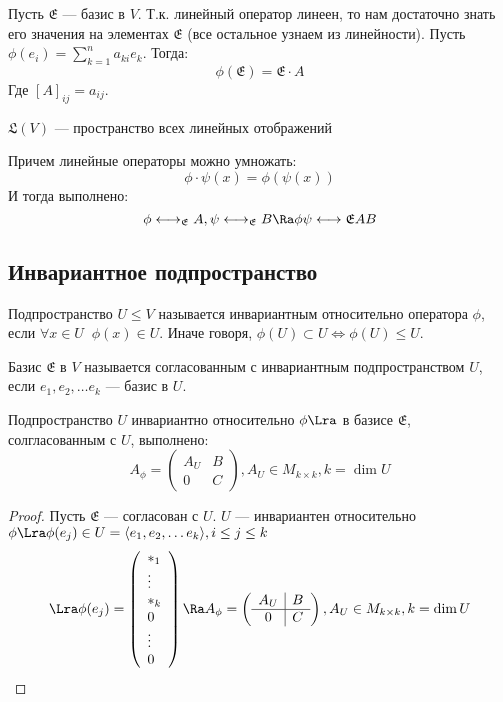 Пусть  \(\mathfrak{E}\) --- базис в \(V\). Т.к. линейный оператор линеен, то нам достаточно знать его значения на элементах \(\mathfrak{E}\) (все остальное узнаем из линейности).
Пусть \(\phi(e_i) = \sum_{k = 1}^n a_{ki}e_k\). Тогда:
\[\phi(\mathfrak{E}) = \mathfrak{E}\cdot A\]
Где \([A]_{ij} = a_{ij}\).

\begin{definition}
    \(\mathfrak{L}(V)\) --- пространство всех линейных отображений
\end{definition}

Причем линейные операторы можно умножать:
\[\phi\cdot\psi(x) = \phi(\psi(x))\]
И тогда выполнено:
\[\phi \longleftrightarrow_{\mathfrak{E}} A, \psi \longleftrightarrow_{\mathfrak{E}} B \Ra \phi\psi \longleftrightarrow{\mathfrak{E}} AB\]

\subsection{Инвариантное подпространство}
\begin{definition}
    Подпространство \(U \le V\) называется инвариантным относительно оператора \(\phi\), если \(\forall x \in U\;\;\phi(x) \in U\). Иначе говоря, \(\phi(U) \subset U \Leftrightarrow \phi(U) \le U\).
\end{definition}

\begin{definition}
    Базис \(\mathfrak{E}\) в \(V\) называется согласованным с инвариантным подпространством \(U\), если \(e_1, e_2, \dots e_k\) --- базис в \(U\).
\end{definition}

\begin{proposition}
    Подпространство \(U\) инвариантно относительно \(\phi \Lra\) в базисе \(\mathfrak{E}\), солгласованным с \(U\), выполнено:
    \[A_\phi = \left(\begin{array}{c|c}
        A_U & B \\
        \hline
        0 & C
    \end{array}\right), A_U \in M_{k \times k}, k = \dim U\]
\end{proposition}
\begin{proof}
    Пусть \(\mathfrak{E}\) --- согласован с \(U\). \(U\) --- инвариантен относительно \(\phi \Lra \phi(e_j) \in U = \langle e_1, e_2, \dots e_k\rangle, i \le j \le k\)
    \[\Lra \phi(e_j) = \left(\begin{array}{l}
        *_1 \\
        \vdots \\
        *_k \\
        0 \\
        \vdots \\
        0
    \end{array}\right) \Ra A_\phi = \left(\begin{array}{c|c}
        A_U & B \\
        \hline
        0 & C
    \end{array}\right), A_U \in M_{k \times k}, k = \dim U\]
\end{proof}

